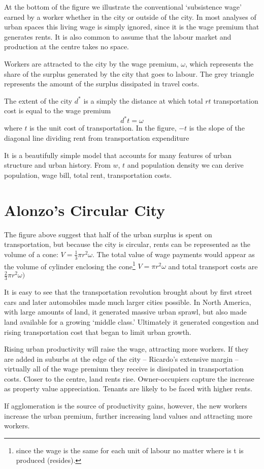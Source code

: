 At the bottom of the figure we illustrate the conventional `subsistence wage'  earned by a worker whether in the city or outside of the city.   In most analyses of urban spaces this living wage is simply ignored, since it is the wage premium that generates rents.  It is also common to assume that the labour market and production at the centre takes no space.   


Workers are attracted to the city by the wage premium, $\omega$,  which represents the share of the surplus generated by the city that goes to labour.  The grey triangle represents the amount of the surplus dissipated in travel costs.  

The extent  of the city  $d^*$ is a simply the distance at which total $rt$ transportation cost  is equal to the wage premium
\[d^* t= \omega\]
where $t$ is the unit cost of transportation. In the figure, $-t$ is the slope of the diagonal line dividing rent from transportation expenditure

It is a beautifully simple model that accounts for many features of urban structure and urban history. From $w$, $t$ and population density we can derive population, wage bill, total rent, transportation costs.

 \section{Alonzo's Circular City}
The figure above suggest that  half of the urban surplus is spent on transportation, but because the city is circular,  rents can be represented as the volume of a cone:  
$ V=\frac{1}{3}\pi  r^2 \omega$. The total value of wage payments would appear as the volume of cylinder enclosing the cone\footnote{since the wage is the same for each unit of labour no matter where is t is produced (resides).} 
$V=\pi r^2 \omega$
and total transport costs are 
$\frac{2}{3}\pi  r^2 \omega)$

 





 It is easy to see that the transportation revolution brought about by first street cars and later automobiles made much larger cities possible. In North America, with large amounts of land, it generated massive urban sprawl, but also made land available for a growing `middle class.' Ultimately it generated congestion and rising transportation cost that began to limit urban growth. 

Rising urban productivity will raise the wage, attracting more workers. If they are added in suburbs at the edge of the city -- Ricardo's extensive margin -- virtually all of the wage premium they receive is dissipated in transportation costs. Closer to the centre,  land rents rise. Owner-occupiers capture the increase as property value appreciation. Tenants are likely to be faced with higher rents.      

If agglomeration is the source of productivity gains, however, the new workers increase the urban premium, further increasing land values and attracting more workers. 
